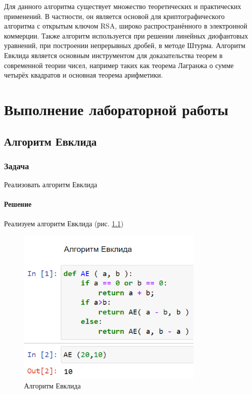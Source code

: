 \documentclass[
  12pt,
  a4paper,
]{scrreprt}
\begin{document}
Для данного алгоритма существует множество теоретических и практических
применений. В частности, он является основой для криптографического
алгоритма с открытым ключом RSA, широко распространённого в электронной
коммерции. Также алгоритм используется при решении линейных диофантовых
уравнений, при построении непрерывных дробей, в методе Штурма. Алгоритм
Евклида является основным инструментом для доказательства теорем в
современной теории чисел, например таких как теорема Лагранжа о сумме
четырёх квадратов и основная теорема арифметики.

\chapter{Выполнение лабораторной
работы}\label{ux432ux44bux43fux43eux43bux43dux435ux43dux438ux435-ux43bux430ux431ux43eux440ux430ux442ux43eux440ux43dux43eux439-ux440ux430ux431ux43eux442ux44b}

\section{Алгоритм
Евклида}\label{ux430ux43bux433ux43eux440ux438ux442ux43c-ux435ux432ux43aux43bux438ux434ux430}

\subsection{Задача}\label{ux437ux430ux434ux430ux447ux430}

Реализовать алгоритм Евклида

\subsubsection{Решение}\label{ux440ux435ux448ux435ux43dux438ux435}

Реализуем алгоритм Евклида (рис. \ref{fig:001})

\begin{figure}
\centering
\includegraphics[width=0.8\textwidth,height=\textheight]{./tex2pdf.-e48f57e5a48111ba/image/1.png}
\caption{Алгоритм Евклида}\label{fig:001}
\end{figure}
\end{document}
